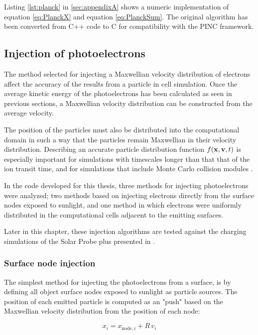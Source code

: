 Listing \ref{lst:planck} in \cref{sec:appendixA} shows a numeric implementation of equation \eqref{eq:PlanckX} and equation \eqref{eq:PlanckSum}. The original algorithm \parencite{Blackbody} has been converted from C++ code to C for compatibility with the PINC framework.


\subsection{Injection of photoelectrons}\label{subsec:injection}
The method selected for injecting a Maxwellian velocity distribution of electrons affect the accuracy of the results from a particle in cell simulation. Once the average kinetic energy of the photoelectrons has been calculated as seen in previous sections, a Maxwellian velocity distribution can be constructed from the average velocity. 

The position of the particles must also be distributed into the computational domain in such a way that the particles remain Maxwellian in their velocity distribution. Describing an accurate particle distribution function $f(\vb{x}, \vb{v}, t)$ is especially important for simulations with timescales longer than that that of the ion transit time, and for simulations that include Monte Carlo collision modules \parencite{Cartwright2000}.  

In the code developed for this thesis, three methods for injecting photoelectrons were analyzed; two methods based on injecting electrons directly from the surface nodes exposed to sunlight, and one method in which electrons were uniformly distributed in the computational cells adjacent to the emitting surfaces.

Later in this chapter, these injection algorithms are tested against the charging simulations of the Solar Probe plus presented in \parencite{Deca2013}.

\subsubsection*{Surface node injection}

The simplest method for injecting the photoelectrons from a surface, is by defining all object surface nodes exposed to sunlight as particle sources. The position of each emitted particle is computed as an "push" based on the Maxwellian velocity distribution from the position of each node:

\begin{equation}\label{eq:injection}
    x_i = x_{\text{node},i} + R \, v_i
\end{equation}

